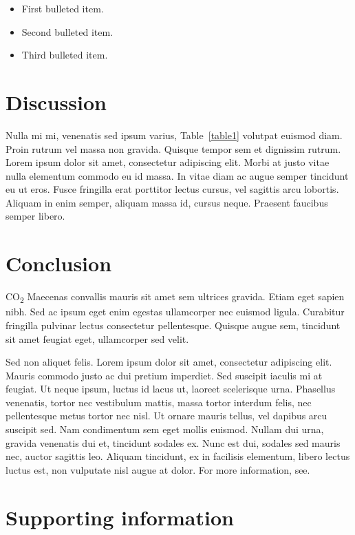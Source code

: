 \documentclass[10pt,letterpaper]{article}
\begin{document}
\begin{itemize}
	\item First bulleted item.
	\item Second bulleted item.
	\item Third bulleted item.
\end{itemize}

\section*{Discussion}
Nulla mi mi, venenatis sed ipsum varius, Table~\ref{table1} volutpat euismod diam. Proin rutrum vel massa non gravida. Quisque tempor sem et dignissim rutrum. Lorem ipsum dolor sit amet, consectetur adipiscing elit. Morbi at justo vitae nulla elementum commodo eu id massa. In vitae diam ac augue semper tincidunt eu ut eros. Fusce fringilla erat porttitor lectus cursus, vel sagittis arcu lobortis. Aliquam in enim semper, aliquam massa id, cursus neque. Praesent faucibus semper libero.

\section*{Conclusion}

CO\textsubscript{2} Maecenas convallis mauris sit amet sem ultrices gravida. Etiam eget sapien nibh. Sed ac ipsum eget enim egestas ullamcorper nec euismod ligula. Curabitur fringilla pulvinar lectus consectetur pellentesque. Quisque augue sem, tincidunt sit amet feugiat eget, ullamcorper sed velit. 

Sed non aliquet felis. Lorem ipsum dolor sit amet, consectetur adipiscing elit. Mauris commodo justo ac dui pretium imperdiet. Sed suscipit iaculis mi at feugiat. Ut neque ipsum, luctus id lacus ut, laoreet scelerisque urna. Phasellus venenatis, tortor nec vestibulum mattis, massa tortor interdum felis, nec pellentesque metus tortor nec nisl. Ut ornare mauris tellus, vel dapibus arcu suscipit sed. Nam condimentum sem eget mollis euismod. Nullam dui urna, gravida venenatis dui et, tincidunt sodales ex. Nunc est dui, sodales sed mauris nec, auctor sagittis leo. Aliquam tincidunt, ex in facilisis elementum, libero lectus luctus est, non vulputate nisl augue at dolor. For more information, see.



\section*{Supporting information}
\end{document}
